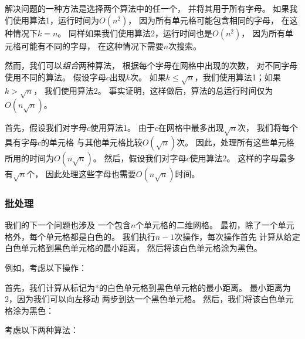 解决问题的一种方法是选择两个算法中的任一个，
并将其用于所有字母。
如果我们使用算法1，运行时间为$O(n^2)$，
因为所有单元格可能包含相同的字母，
在这种情况下$k=n$。
同样如果我们使用算法2，运行时间也是$O(n^2)$，
因为所有单元格可能有不同的字母，
在这种情况下需要$n$次搜索。

然而，我们可以\emph{组合}两种算法，
根据每个字母在网格中出现的次数，
对不同字母使用不同的算法。
假设字母$c$出现$k$次。
如果$k \le \sqrt n$，我们使用算法1；如果$k > \sqrt n$，
我们使用算法2。
事实证明，这样做后，算法的总运行时间仅为$O(n \sqrt n)$。

首先，假设我们对字母$c$使用算法1。
由于$c$在网格中最多出现$\sqrt n$次，
我们将每个具有字母$c$的单元格
与其他单元格比较$O(\sqrt n)$次。
因此，处理所有这些单元格所用的时间为$O(n \sqrt n)$。
然后，假设我们对字母$c$使用算法2。
这样的字母最多有$\sqrt n$个，
因此处理这些字母也需要$O(n \sqrt n)$时间。

\subsubsection{批处理}

我们的下一个问题也涉及
一个包含$n$个单元格的二维网格。
最初，除了一个单元格外，每个单元格都是白色的。
我们执行$n-1$次操作，每次操作首先
计算从给定白色单元格到黑色单元格的最小距离，
然后将该白色单元格涂为黑色。

例如，考虑以下操作：

\begin{center}
\end{center}

首先，我们计算从标记为*的白色单元格到黑色单元格的最小距离。
最小距离为2，因为我们可以向左移动
两步到达一个黑色单元格。
然后，我们将该白色单元格涂为黑色：

\begin{center}
\end{center}

考虑以下两种算法：

